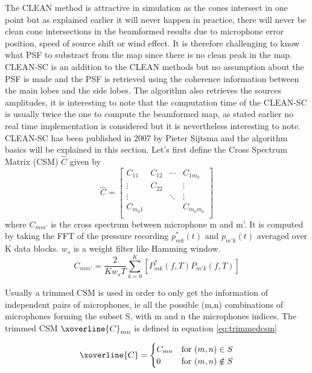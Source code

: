 The CLEAN method is attractive in simulation as the cones intersect in one point but as explained earlier it will never happen in practice, there will never be clean cone intersections in the beamformed results due to microphone error position, speed of source shift or wind effect. It is therefore challenging to know what PSF to substract from the map since there is no clean peak in the map. CLEAN-SC is an addition to the CLEAN methods but no assumption about the PSF is made and the PSF is retrieved using the coherence information between the main lobes and the side lobes. The algorithm also retrieves the sources amplitudes, it is interesting to note that the computation time of the CLEAN-SC is usually twice the one to compute the beamformed map, as stated earlier no real time implementation is considered but it is nevertheless interesting to note. CLEAN-SC \cite{sijtsma2007clean} has been published in 2007 by Pieter Sijtsma and the algorithm basics will be explained in this section. Let's first define the Cross Spectrum Matrix (CSM) $\hat{C}$ given by
\begin{equation}
\hat{C}=
    \begin{bmatrix} 
      C_{11} & C_{12} & \cdots & C_{1m_{0}}\\
      \vdots &  C_{22} &       &  \vdots\\
      \vdots &         & \ddots &  \vdots\\
      C_{m_{0}1} &     &       &  C_{m_{0}m_{0}}\\
    \end{bmatrix}  
\end{equation}
where $C_{mm'}$ is the cross spectrum between microphone m  and m'. It is computed by taking the FFT of the pressure recording $p^{*}_{mk}(t)$ and $p_{m'k}(t)$ averaged over K data blocks. $w_{s}$ is a weight filter like Hamming window.
\begin{equation}
    C_{mm'}=\frac{2}{Kw_{s}T}\sum\limits_{k=0}^{K}[P^{*}_{mk}(f,T)P_{m'k}(f,T)]
\end{equation}

Usually a trimmed CSM is used in order to only get the information of independent pairs of microphones, ie all the possible (m,n) combinations of microphones forming the subset S, with m and n the microphones indices. The trimmed CSM  ${\xoverline{C}_{mn}}$ is defined in equation \ref{eq:trimmedcsm}

\begin{equation}
     \xoverline{C} = 
      \begin{cases} 
       C_{mn} & \text{for } (m,n) \in S \\
       0      & \text{for } (m,n) \notin  S
      \end{cases}
    \label{eq:trimmedcsm}
\end{equation}

